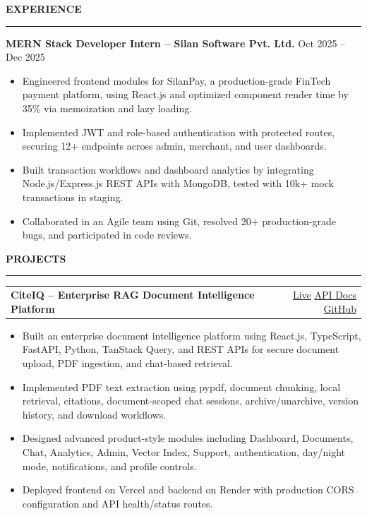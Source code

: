 \documentclass[a4paper,10pt]{article}
\newcommand{\mysection}[1]{%
\vspace{2pt}
\noindent\textbf{\large #1}
\vspace{1pt}
\hrule
\vspace{2pt}
}
\begin{document}
\mysection{EXPERIENCE}

\textbf{MERN Stack Developer Intern -- Silan Software Pvt. Ltd.} \hfill Oct 2025 -- Dec 2025
\begin{itemize}
\item Engineered frontend modules for SilanPay, a production-grade FinTech payment platform, using React.js and optimized component render time by 35\% via memoization and lazy loading.
\item Implemented JWT and role-based authentication with protected routes, securing 12+ endpoints across admin, merchant, and user dashboards.
\item Built transaction workflows and dashboard analytics by integrating Node.js/Express.js REST APIs with MongoDB, tested with 10k+ mock transactions in staging.
\item Collaborated in an Agile team using Git, resolved 20+ production-grade bugs, and participated in code reviews.
\end{itemize}

\mysection{PROJECTS}

\begin{tabularx}{\linewidth}{@{}X r@{}}
\textbf{CiteIQ -- Enterprise RAG Document Intelligence Platform} &
\href{https://cite-iq.vercel.app}{Live} \quad
\href{https://citeiq.onrender.com/docs}{API Docs} \quad
\href{https://github.com/kamranahmad786/CiteIQ}{GitHub} \\
\end{tabularx}
\begin{itemize}
\item Built an enterprise document intelligence platform using React.js, TypeScript, FastAPI, Python, TanStack Query, and REST APIs for secure document upload, PDF ingestion, and chat-based retrieval.
\item Implemented PDF text extraction using pypdf, document chunking, local retrieval, citations, document-scoped chat sessions, archive/unarchive, version history, and download workflows.
\item Designed advanced product-style modules including Dashboard, Documents, Chat, Analytics, Admin, Vector Index, Support, authentication, day/night mode, notifications, and profile controls.
\item Deployed frontend on Vercel and backend on Render with production CORS configuration and API health/status routes.
\end{itemize}
\end{document}
